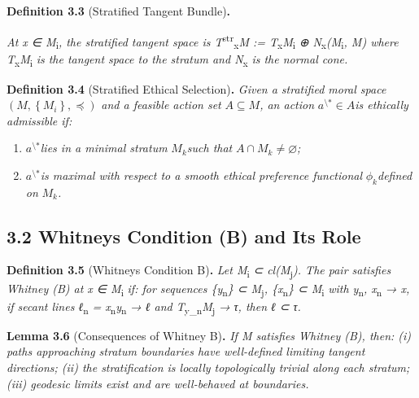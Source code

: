 \documentclass[12pt]{article}
\theoremstyle{plain}
\theoremstyle{definition}
\theoremstyle{remark}
\begin{document}
\textbf{Definition 3.3} (Stratified Tangent Bundle)\textbf{.}

\emph{At x ∈ M}\textsubscript{i}\emph{, the stratified tangent space is
T}\textsuperscript{str}\textsubscript{x}\emph{M :=
T}\textsubscript{x}\emph{M}\textsubscript{i} \emph{⊕
N}\textsubscript{x}\emph{(M}\textsubscript{i}\emph{, M) where
T}\textsubscript{x}\emph{M}\textsubscript{i} \emph{is the tangent space
to the stratum and N}\textsubscript{x} \emph{is the normal cone.}

\textbf{Definition 3.4} (Stratified Ethical Selection)\textbf{.}
\emph{Given a stratified moral space}
\(\left( M,\left\{ M_{i} \right\}, \preceq \right)\) \emph{and a
feasible action set} \(A \subseteq M\)\emph{, an action}
\(a^{\text{\textbackslash*}} \in A\)\emph{is ethically admissible if:}

\begin{enumerate}
\item
  \(a^{\text{\textbackslash*}}\)\emph{lies in a minimal stratum}
  \(M_{k}\)\emph{such that} \(A \cap M_{k} \neq \varnothing\)\emph{;}
\item
  \(a^{\text{\textbackslash*}}\)\emph{is maximal with respect to a
  smooth ethical preference functional} \(\phi_{k}\)\emph{defined on}
  \(M_{k}\)\emph{.}
\end{enumerate}

\subsection{3.2 Whitney\textquotesingle s Condition (B) and Its
Role}\label{whitneys-condition-b-and-its-role}

\textbf{Definition 3.5} (Whitney\textquotesingle s Condition
B)\textbf{.} \emph{Let M}\textsubscript{i} \emph{⊂
cl(M}\textsubscript{j}\emph{). The pair satisfies Whitney (B) at x ∈
M}\textsubscript{i} \emph{if: for sequences
\{y}\textsubscript{n}\emph{\} ⊂ M}\textsubscript{j}\emph{,
\{x}\textsubscript{n}\emph{\} ⊂ M}\textsubscript{i} \emph{with
y}\textsubscript{n}\emph{, x}\textsubscript{n} \emph{→ x, if secant
lines ℓ}\textsubscript{n} \emph{=
x}\textsubscript{n}\emph{y}\textsubscript{n} \emph{→ ℓ and
T}\textsubscript{y\_n}\emph{M}\textsubscript{j} \emph{→ τ, then ℓ ⊂ τ.}

\textbf{Lemma 3.6} (Consequences of Whitney B)\textbf{.} \emph{If M
satisfies Whitney (B), then: (i) paths approaching stratum boundaries
have well-defined limiting tangent directions; (ii) the stratification
is locally topologically trivial along each stratum; (iii) geodesic
limits exist and are well-behaved at boundaries.}
\end{document}

